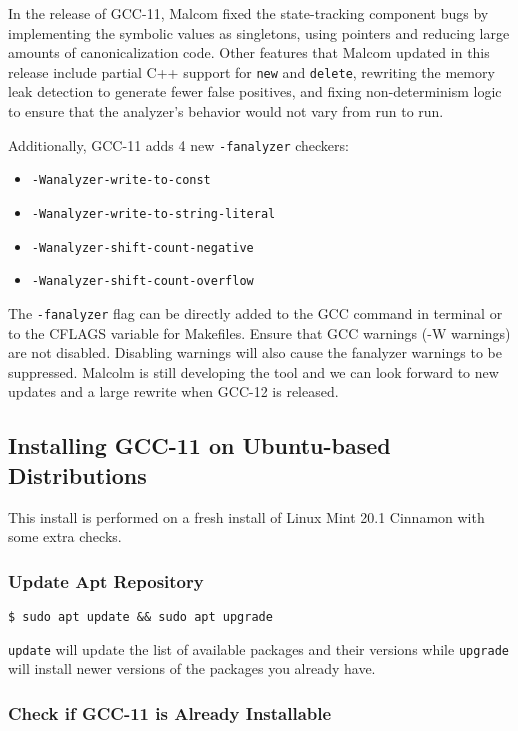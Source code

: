 In the release of GCC-11, Malcom fixed the state-tracking component bugs by implementing the symbolic values as singletons, using pointers and reducing large amounts of canonicalization code. Other features that Malcom updated in this release include partial C++ support for \texttt{new} and \texttt{delete}, rewriting the memory leak detection to generate fewer false positives, and fixing non-determinism logic to ensure that the analyzer's behavior would not vary from run to run.\autocite{20211220:gcc11}

Additionally, GCC-11 adds 4 new \texttt{-fanalyzer} checkers: 
\begin{itemize}
	\item \texttt{-Wanalyzer-write-to-const}
	\item \texttt{-Wanalyzer-write-to-string-literal}
	\item \texttt{-Wanalyzer-shift-count-negative} 
	\item \texttt{-Wanalyzer-shift-count-overflow}
\end{itemize}

The \texttt{-fanalyzer} flag can be directly added to the GCC command in terminal or to the CFLAGS variable for Makefiles. Ensure that GCC warnings (-W warnings) are not disabled. Disabling warnings will also cause the fanalyzer warnings to be suppressed. Malcolm is still developing the tool and we can look forward to new updates and a large rewrite when GCC-12 is released.

\subsection{Installing GCC-11 on Ubuntu-based Distributions}

This install is performed on a fresh install of Linux Mint 20.1 Cinnamon with some extra checks.

\subsubsection{Update Apt Repository}

\texttt{\$\ sudo apt update \&\&\ sudo apt upgrade}

\texttt{update} will update the list of available packages and their versions while \texttt{upgrade} will install newer versions of the packages you already have.

\subsubsection{Check if GCC-11 is Already Installable}

